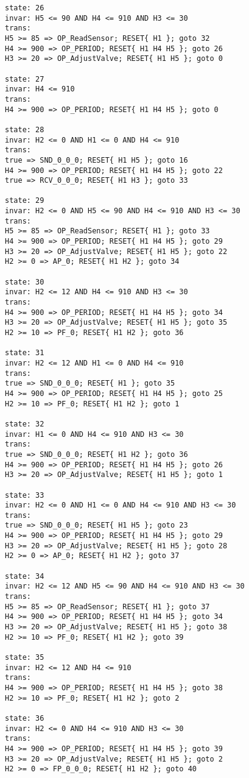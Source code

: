 {\begin{verbatim}
state: 26
invar: H5 <= 90 AND H4 <= 910 AND H3 <= 30
trans: 
H5 >= 85 => OP_ReadSensor; RESET{ H1 }; goto 32
H4 >= 900 => OP_PERIOD; RESET{ H1 H4 H5 }; goto 26
H3 >= 20 => OP_AdjustValve; RESET{ H1 H5 }; goto 0

state: 27
invar: H4 <= 910
trans: 
H4 >= 900 => OP_PERIOD; RESET{ H1 H4 H5 }; goto 0

state: 28
invar: H2 <= 0 AND H1 <= 0 AND H4 <= 910
trans: 
true => SND_0_0_0; RESET{ H1 H5 }; goto 16
H4 >= 900 => OP_PERIOD; RESET{ H1 H4 H5 }; goto 22
true => RCV_0_0_0; RESET{ H1 H3 }; goto 33

state: 29
invar: H2 <= 0 AND H5 <= 90 AND H4 <= 910 AND H3 <= 30
trans: 
H5 >= 85 => OP_ReadSensor; RESET{ H1 }; goto 33
H4 >= 900 => OP_PERIOD; RESET{ H1 H4 H5 }; goto 29
H3 >= 20 => OP_AdjustValve; RESET{ H1 H5 }; goto 22
H2 >= 0 => AP_0; RESET{ H1 H2 }; goto 34

state: 30
invar: H2 <= 12 AND H4 <= 910 AND H3 <= 30
trans: 
H4 >= 900 => OP_PERIOD; RESET{ H1 H4 H5 }; goto 34
H3 >= 20 => OP_AdjustValve; RESET{ H1 H5 }; goto 35
H2 >= 10 => PF_0; RESET{ H1 H2 }; goto 36

state: 31
invar: H2 <= 12 AND H1 <= 0 AND H4 <= 910
trans: 
true => SND_0_0_0; RESET{ H1 }; goto 35
H4 >= 900 => OP_PERIOD; RESET{ H1 H4 H5 }; goto 25
H2 >= 10 => PF_0; RESET{ H1 H2 }; goto 1

state: 32
invar: H1 <= 0 AND H4 <= 910 AND H3 <= 30
trans: 
true => SND_0_0_0; RESET{ H1 H2 }; goto 36
H4 >= 900 => OP_PERIOD; RESET{ H1 H4 H5 }; goto 26
H3 >= 20 => OP_AdjustValve; RESET{ H1 H5 }; goto 1

state: 33
invar: H2 <= 0 AND H1 <= 0 AND H4 <= 910 AND H3 <= 30
trans: 
true => SND_0_0_0; RESET{ H1 H5 }; goto 23
H4 >= 900 => OP_PERIOD; RESET{ H1 H4 H5 }; goto 29
H3 >= 20 => OP_AdjustValve; RESET{ H1 H5 }; goto 28
H2 >= 0 => AP_0; RESET{ H1 H2 }; goto 37

state: 34
invar: H2 <= 12 AND H5 <= 90 AND H4 <= 910 AND H3 <= 30
trans: 
H5 >= 85 => OP_ReadSensor; RESET{ H1 }; goto 37
H4 >= 900 => OP_PERIOD; RESET{ H1 H4 H5 }; goto 34
H3 >= 20 => OP_AdjustValve; RESET{ H1 H5 }; goto 38
H2 >= 10 => PF_0; RESET{ H1 H2 }; goto 39

state: 35
invar: H2 <= 12 AND H4 <= 910
trans: 
H4 >= 900 => OP_PERIOD; RESET{ H1 H4 H5 }; goto 38
H2 >= 10 => PF_0; RESET{ H1 H2 }; goto 2

state: 36
invar: H2 <= 0 AND H4 <= 910 AND H3 <= 30
trans: 
H4 >= 900 => OP_PERIOD; RESET{ H1 H4 H5 }; goto 39
H3 >= 20 => OP_AdjustValve; RESET{ H1 H5 }; goto 2
H2 >= 0 => FP_0_0_0; RESET{ H1 H2 }; goto 40


\end{verbatim}}
